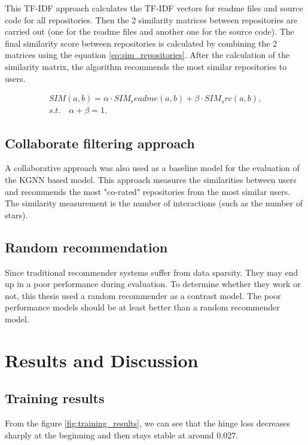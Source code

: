 \documentclass[11pt,twoside]{report}
\begin{document}
This TF-IDF approach calculates the TF-IDF vectors for readme files and source code for all repositories. Then the 2 similarity matrices between repositories are carried out (one for the readme files and another one for the source code). The final similarity score between repositories is calculated by combining the 2 matrices using the equation \ref{eq:sim_repositories}. After the calculation of the similarity matrix, the algorithm recommends the most similar repositories to users.

\begin{gather}
    SIM(a,b)=\alpha\cdot{SIM_readme(a,b)}+\beta\cdot{SIM_src(a,b)}, \\
    s.t.\quad\alpha+\beta=1.
    \label{eq:sim_repositories}
\end{gather}

\section{Collaborate filtering approach}
A collaborative approach \cite{guendouz_recommending_2015} was also used as a baseline model for the evaluation of the KGNN based model. This approach measures the similarities between users and recommends the most "co-rated" repositories from the most similar users. The similarity measurement is the number of interactions (such as the number of stars).


\section{Random recommendation}
Since traditional recommender systems suffer from data sparsity. They may end up in a poor performance during evaluation. To determine whether they work or not, this thesis used a random recommender as a contrast model. The poor performance models should be at least better than a random recommender model.

\chapter{Results and Discussion}
\section{Training results}
From the figure \ref{fig:training_results}, we can see that the hinge loss decreases sharply at the beginning and then stays stable at around 0.027.
\end{document}
